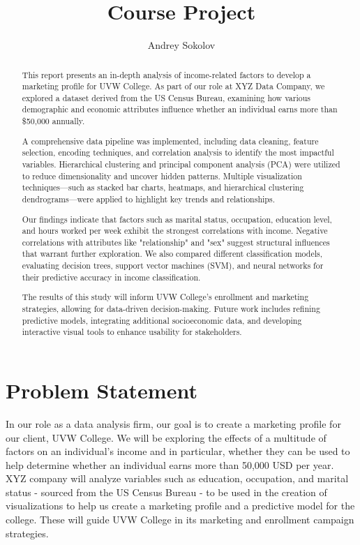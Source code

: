 \documentclass[journal]{IEEEtran}
\begin{document}
\title{Course Project}

\author{Andrey Sokolov}

\maketitle

\begin{abstract}
This report presents an in-depth analysis of income-related factors to develop a marketing profile for UVW College. As part of our role at XYZ Data Company, we explored a dataset derived from the US Census Bureau, examining how various demographic and economic attributes influence whether an individual earns more than \$50,000 annually. 

A comprehensive data pipeline was implemented, including data cleaning, feature selection, encoding techniques, and correlation analysis to identify the most impactful variables. Hierarchical clustering and principal component analysis (PCA) were utilized to reduce dimensionality and uncover hidden patterns. Multiple visualization techniques—such as stacked bar charts, heatmaps, and hierarchical clustering dendrograms—were applied to highlight key trends and relationships.

Our findings indicate that factors such as marital status, occupation, education level, and hours worked per week exhibit the strongest correlations with income. Negative correlations with attributes like "relationship" and "sex" suggest structural influences that warrant further exploration. We also compared different classification models, evaluating decision trees, support vector machines (SVM), and neural networks for their predictive accuracy in income classification.

The results of this study will inform UVW College’s enrollment and marketing strategies, allowing for data-driven decision-making. Future work includes refining predictive models, integrating additional socioeconomic data, and developing interactive visual tools to enhance usability for stakeholders.
\end{abstract}

\section{Problem Statement}
In our role as a data analysis firm, our goal is to create a marketing profile for our client, UVW College. We will be exploring the effects of a multitude of factors
on an individual's income and in particular, whether they can be used to help determine whether an individual earns more than 50,000 USD per year. XYZ company will analyze
variables such as education, occupation, and marital status - sourced from the US Census Bureau - to be used in the creation of visualizations to help us create a marketing profile and a predictive model for the college. These will guide
UVW College in its marketing and enrollment campaign strategies.
\end{document}
